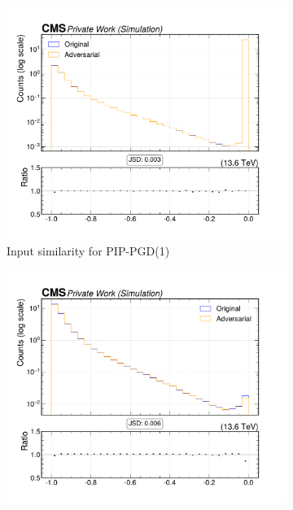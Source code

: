 \begin{figure}[htbp]
  \centering
  \begin{subfigure}[t]{0.32\textwidth}
    \includegraphics[width=\linewidth]{media/output/features/compare/combined_it_1/cmp_npf_arr_Npfcan_ptrel.pdf}
    \caption*{Input similarity for PIP-PGD(1)}
  \end{subfigure}\hfill
  \begin{subfigure}[t]{0.32\textwidth}
    \includegraphics[width=\linewidth]{media/output/features/compare/combined_it_2/cmp_npf_arr_Npfcan_ptrel.pdf}

\end{subfigure}
\end{figure}
